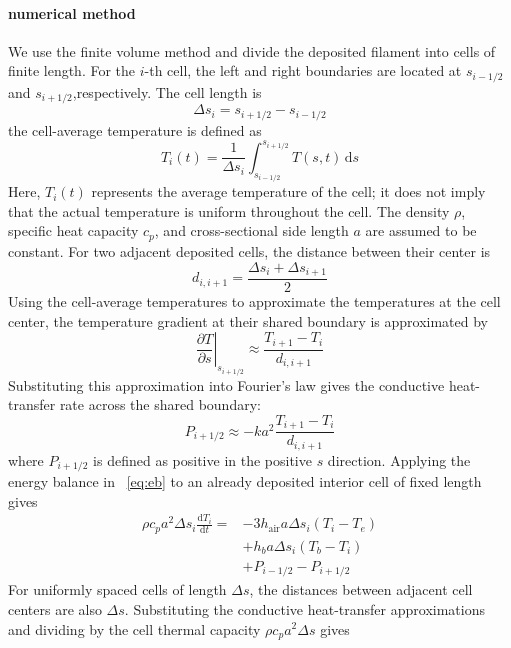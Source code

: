 \documentclass{article}
\begin{document}
\paragraph{numerical method}
We use the finite volume method and divide the deposited filament into cells of finite length. For the $i$-th cell, the left and right boundaries are located at $s_{i-1/2}$ and $s_{i+1/2}$,respectively.
The cell length is
\begin{equation}
\Delta s_i 
=s_{i+1/2}-s_{i-1/2}
\end{equation}
the cell-average temperature is defined as
\begin{equation}
T_i(t)=\frac{1}{\Delta s_i}\int_{s_{i-1/2}}^{s_{i+1/2}}{T(s,t)}\,\mathrm{d}s
\end{equation}
Here, $T_i(t)$ represents the average temperature of the cell; it does not imply that the actual temperature is uniform throughout the cell. The density $\rho$, specific heat capacity $c_p$, and cross-sectional side length $a$ are assumed to be constant. 
For two adjacent deposited cells, the distance between their center is 
\begin{equation}
d_{i,i+1}=\frac{\Delta s_i+\Delta s_{i+1}}{2}
\end{equation}
Using the cell-average temperatures to approximate the temperatures at the cell center, the temperature gradient at their shared boundary is approximated by
\begin{equation}
\left.\frac{\partial T}{\partial s}\right|_{s_{i+1/2}}
\approx \frac{T_{i+1}-T_i}{d_{i,i+1}}
\end{equation}
Substituting this approximation into Fourier's law gives the conductive heat-transfer rate across the shared boundary:
\begin{equation}
    P_{i+1/2}
    \approx -ka^2\frac{T_{i+1}-T_i}{d_{i,i+1}}
\end{equation}
where $P_{i+1/2}$ is defined as positive in the positive $s$ direction.
Applying the energy balance in ~\eqref{eq:eb} to an already deposited interior cell of fixed length gives
\begin{equation}
\begin{aligned}
\rho c_p a^2 \Delta s_i \frac{\mathrm{d}T_i}{\mathrm{d}t}
= {}&-3h_{\mathrm{air}}a\Delta s_i(T_i-T_e)\\
  &+h_b a\Delta s_i(T_b-T_i) \\
  {}&+  P_{i-1/2}-P_{i+1/2}
\end{aligned}
\end{equation}
For uniformly spaced cells of length $\Delta s$, the distances between adjacent cell centers are also $\Delta s$. Substituting the conductive heat-transfer approximations and dividing by the cell thermal capacity $\rho c_p a^2 \Delta s$ gives
\end{document}
